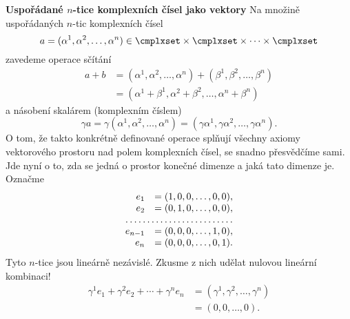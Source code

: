 \begin{mdframed}[style=mdexam]
  \begin{example}\label{mai:exam107}
    \textbf{Uspořádané \(n\)-tice komplexních čísel jako vektory}\newline
    Na množině uspořádaných \(n\)-tic komplexních čísel
    \begin{equation*}
      a=(\alpha^1,\alpha^2,\ldots,\alpha^n)\in\cmplxset\times\cmplxset\times\cdots\times\cmplxset
    \end{equation*}
    zavedeme operace sčítání
    \begin{align}
      a + b &= (\alpha^1,\alpha^2,\ldots,\alpha^n) + (\beta^1,\beta^2,\ldots,\beta^n)   \nonumber\\
            &= (\alpha^1+ \beta^1,\alpha^2 +\beta^2,\ldots,\alpha^n + \beta^n)    \label{mai:eq098}
    \end{align}
    a násobení skalárem (komplexním číslem)
    \begin{equation}\label{mai:eq099}
      \gamma a = \gamma(\alpha^1,\alpha^2,\ldots,\alpha^n) 
               = (\gamma\alpha^1,\gamma\alpha^2,\ldots,\gamma\alpha^n). 
    \end{equation}
    O tom, že takto konkrétně definované operace splňují všechny axiomy vektorového prostoru nad
    polem komplexních čísel, se snadno přesvědčíme sami. Jde nyní o to, zda se jedná o prostor
    konečné dimenze a jaká tato dimenze je. Označme
    \begingroup
    \setlength{\arraycolsep}{0pt}
    \begin{equation*}
    \begin{array}{rl}
      e_1     &= (1, 0, 0, \ldots, 0, 0),  \\
      e_2     &= (0, 1, 0, \ldots, 0, 0),  \\
      \hdotsfor{2}                         \\
      e_{n-1} &= (0, 0, 0, \ldots, 1, 0),  \\
      e_n     &= (0, 0, 0, \ldots, 0, 1).
    \end{array}
    \end{equation*}
    Tyto \(n\)-tice jsou lineárně nezávislé. Zkusme z nich udělat nulovou lineární kombinaci!
    \begin{align*}
      \gamma^1e_1 + \gamma^2e_2 + \cdots + \gamma^ne_n 
        &= (\gamma^1, \gamma^2, \ldots, \gamma^n)              \\
        &= (0,0, \ldots, 0).

\end{align*}
\end{example}
\end{mdframed}

